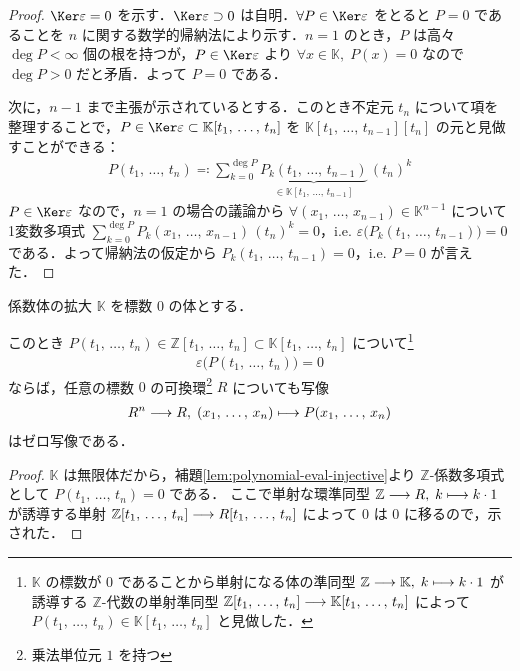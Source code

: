 \documentclass[TQFT_main]{subfiles}
\begin{document}
\begin{proof}
    $\Ker \varepsilon = 0$ を示す．$\Ker \varepsilon \supset 0$ は自明．$\forall P \in \Ker \varepsilon$ をとると $P = 0$ であることを $n$ に関する数学的帰納法により示す．$n=1$ のとき，$P$ は高々 $\deg P < \infty$ 個の根を持つが，$P \in \Ker \varepsilon$ より $\forall x \in \mathbb{K},\; P(x) = 0$ なので $\deg P > 0$ だと矛盾．よって $P = 0$ である．

    次に，$n-1$ まで主張が示されているとする．このとき不定元 $t_n$ について項を整理することで，$P \in \Ker \varepsilon \subset \mathbb{K}[t_1,\, \dots,\, t_n]$ を $\mathbb{K}[t_1,\, \dots,\, t_{n-1}][t_n]$ の元と見做すことができる：
    \begin{align}
        P(t_1,\, \dots,\, t_n) \eqqcolon \sum_{k=0}^{\deg P} \underbrace{P_k(t_1,\, \dots,\, t_{n-1})}_{\in \mathbb{K}[t_1,\, \dots,\, t_{n-1}]}\, (t_n)^k
    \end{align}
    $P \in \Ker \varepsilon$ なので，$n=1$ の場合の議論から $\forall (x_1,\, \dots,\, x_{n-1}) \in \mathbb{K}^{n-1}$ について1変数多項式 $\sum_{k=0}^{\deg P} P_k(x_1,\, \dots,\, x_{n-1})\, (t_n)^k=0$，i.e. $\varepsilon\bigl(P_k(t_1,\, \dots,\, t_{n-1})\bigr) = 0$ である．よって帰納法の仮定から $P_k(t_1,\, \dots,\, t_{n-1}) = 0$，i.e. $P = 0$ が言えた．
\end{proof}

\begin{mylem}[label=lem:Z-extension]{係数体の拡大}
    $\mathbb{K}$ を標数 $0$ の体とする．
    
    このとき $P(t_1,\, \dots,\, t_{n}) \in \mathbb{Z}[t_1,\, \dots,\, t_{n}] \subset \mathbb{K}[t_1,\, \dots,\, t_{n}]$ について\footnote{$\mathbb{K}$ の標数が $0$ であることから単射になる体の準同型 $\mathbb{Z} \longrightarrow \mathbb{K},\; k \longmapsto k \cdot 1$ が誘導する $\mathbb{Z}$-代数の単射準同型 $\mathbb{Z}[t_1,\, \dots,\, t_n] \longrightarrow \mathbb{K}[t_1,\, \dots,\, t_n]$ によって $P(t_1,\, \dots,\, t_n) \in \mathbb{K}[t_1,\, \dots,\, t_n]$ と見做した．}
    \begin{align}
        \varepsilon \bigl( P(t_1,\, \dots,\, t_{n}) \bigr) = 0
    \end{align}
    ならば，任意の標数 $0$ の可換環\footnote{乗法単位元 $1$ を持つ} $R$ についても写像
    \begin{align}
         R^n \longrightarrow R,\; (x_1,\, \dots,\, x_n) \longmapsto P(x_1,\, \dots,\, x_n)
    \end{align}
    はゼロ写像である．
\end{mylem}

\begin{proof}
    $\mathbb{K}$ は無限体だから，補題\ref{lem:polynomial-eval-injective}より $\mathbb{Z}$-係数多項式として $P(t_1,\, \dots,\, t_{n}) = 0$ である．
    ここで単射な環準同型 $\mathbb{Z} \longrightarrow R,\; k \longmapsto k \cdot 1$ が誘導する単射 $\mathbb{Z}[t_1,\, \dots,\, t_{n}] \longrightarrow R[t_1,\, \dots,\, t_{n}]$ によって $0$ は $0$ に移るので，示された．
\end{proof}
\end{document}
